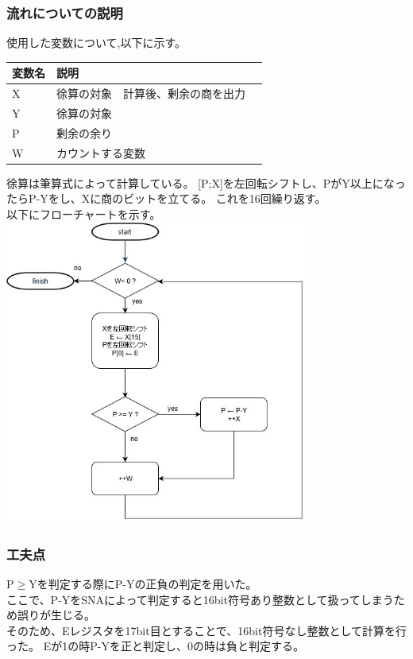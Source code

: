 \documentclass[dvipdfmx,12pt]{jreport}
\begin{document}
\subsubsection*{流れについての説明}
使用した変数について,以下に示す。
\begin{table}[h]
  \begin{tabular}{|l|l|l|} \hline
    変数名 & 説明 \\ \hline
    X & 徐算の対象　計算後、剰余の商を出力 \\ \hline
    Y & 徐算の対象 \\ \hline
    P & 剰余の余り \\ \hline
    W & カウントする変数 \\ \hline
  \end{tabular}
\end{table}

徐算は筆算式によって計算している。
[P;X]を左回転シフトし、PがY以上になったらP-Yをし、Xに商のビットを立てる。
これを16回繰り返す。 \\

以下にフローチャートを示す。 \\

\includegraphics[width=10cm,bb=0 0 542 543]{report1_2_nakata.jpg}



\subsubsection{工夫点}

P$\geq$Yを判定する際にP-Yの正負の判定を用いた。 \\
ここで、P-YをSNAによって判定すると16bit符号あり整数として扱ってしまうため誤りが生じる。 \\
そのため、Eレジスタを17bit目とすることで、16bit符号なし整数として計算を行った。
Eが1の時P-Yを正と判定し、0の時は負と判定する。
\end{document}
